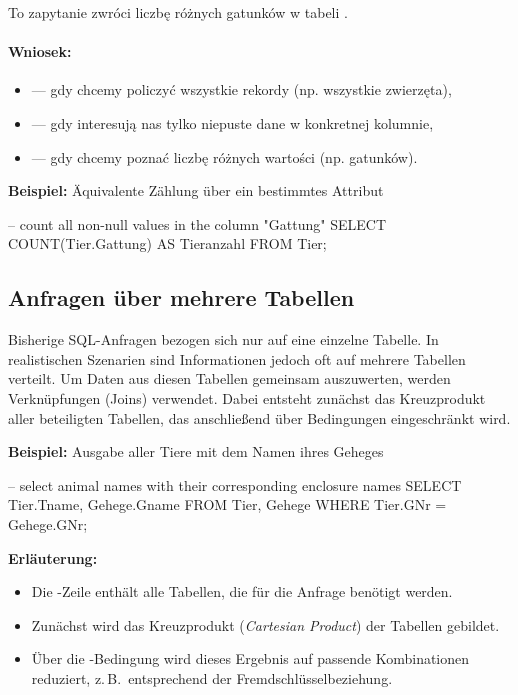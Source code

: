 \begin{tcolorbox}[red={Hinweis}]
        \noindent
        To zapytanie zwróci liczbę różnych gatunków w tabeli .

        \vspace{0.5em}


        \paragraph{Wniosek:}
        \begin{itemize}
            \item {} — gdy chcemy policzyć wszystkie rekordy (np. wszystkie zwierzęta),
            \item {} — gdy interesują nas tylko niepuste dane w konkretnej kolumnie,
            \item {} — gdy chcemy poznać liczbę różnych wartości (np. gatunków).
        \end{itemize}

    \end{tcolorbox}

    \textbf{Beispiel:} Äquivalente Zählung über ein bestimmtes Attribut
    \begin{sql}
    -- count all non-null values in the column "Gattung"
    SELECT COUNT(Tier.Gattung) AS Tieranzahl
    FROM Tier;
    \end{sql}


\subsection{Anfragen über mehrere Tabellen}

    Bisherige SQL-Anfragen bezogen sich nur auf eine einzelne Tabelle.  
    In realistischen Szenarien sind Informationen jedoch oft auf mehrere Tabellen verteilt.  
    Um Daten aus diesen Tabellen gemeinsam auszuwerten, werden Verknüpfungen (Joins) verwendet.  
    Dabei entsteht zunächst das Kreuzprodukt aller beteiligten Tabellen, das anschließend über Bedingungen
    eingeschränkt wird.

    \textbf{Beispiel:} Ausgabe aller Tiere mit dem Namen ihres Geheges
    \begin{sql}
    -- select animal names with their corresponding enclosure names
    SELECT Tier.Tname, Gehege.Gname
        FROM Tier, Gehege
        WHERE Tier.GNr = Gehege.GNr;
    \end{sql}

    \textbf{Erläuterung:}
    \begin{itemize}
        \item Die -Zeile enthält alle Tabellen, die für die Anfrage benötigt werden.
        \item Zunächst wird das Kreuzprodukt (\textit{Cartesian Product}) der Tabellen gebildet.
        \item Über die -Bedingung wird dieses Ergebnis auf passende Kombinationen reduziert,
            z.\,B.\ entsprechend der Fremdschlüsselbeziehung.
    \end{itemize}

